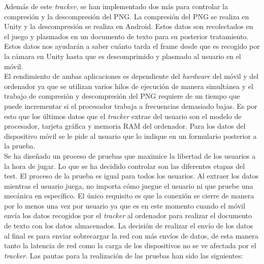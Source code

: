 Adem\'as de este \textit{tracker}, se han implementado dos m\'as para controlar la compresi\'on y la descompresi\'on del PNG. La compresi\'on del PNG se realiza en Unity y la descompresi\'on se realiza en Android. Estos datos son recolectados en el juego y plasmados en un documento de texto para su posterior tratamiento. Estos datos nos ayudar\'an a saber cu\'anto tarda el frame desde que es recogido por la c\'amara en Unity hasta que es descomprimido y plasmado al usuario en el m\'ovil. \\

El rendimiento de ambas aplicaciones es dependiente del \textit{hardware} del m\'ovil y del ordenador ya que se utilizan varios hilos de ejecuci\'on de manera simult\'anea y el trabajo de compresi\'on y descompresi\'on del PNG requiere de un tiempo que puede incrementar si el procesador trabaja a frecuencias demasiado bajas. Es por esto que los \'ultimos datos que el \textit{tracker} extrae del usuario son el modelo de procesador, tarjeta gr\'afica y memoria RAM del ordenador. Para los datos del dispositivo m\'ovil se le pide al usuario que lo indique en un formulario posterior a la prueba.\\

Se ha dise\~nado un proceso de pruebas que maximice la libertad de los usuarios a la hora de jugar. Lo que se ha decidido controlar son las diferentes etapas del test. El proceso de la prueba es igual para todos los usuarios. Al extraer los datos mientras el usuario juega, no importa c\'omo juegue el usuario ni que pruebe una mec\'anica en espec\'ifico. El \'unico requisito es que la conexi\'on se cierre de manera por lo menos una vez por usuario ya que es en este momento cuando el m\'ovil env\'ia los datos recogidos por el \textit{tracker} al ordenador para realizar el documento de texto con los datos almacenados. La decisi\'on de realizar el env\'io de los datos al final es para enviar sobrecargar la red con m\'as env\'ios de datos, de esta manera tanto la latencia de red como la carga de los dispositivos no se ve afectada por el \textit{tracker}. Las pautas para la realizaci\'on de las pruebas han sido las siguientes:\\

